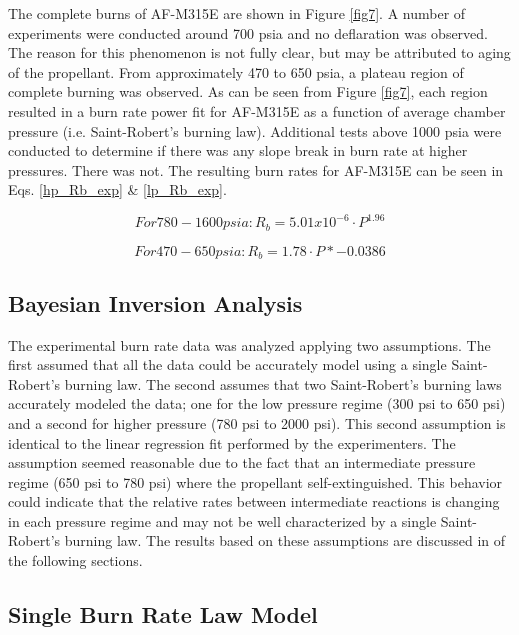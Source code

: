 \documentclass{article}
\begin{document}
The complete burns of AF-M315E are shown in Figure \ref{fig7}. A number of experiments were conducted around 700
psia and no deflaration was observed. The reason for this phenomenon is not fully clear, but may be attributed to
aging of the propellant. From approximately 470 to 650 psia, a plateau region of complete burning was observed. As
can be seen from Figure \ref{fig7}, each region resulted in a burn rate power fit for AF-M315E as a function of 
average chamber pressure (i.e. Saint-Robert's burning law). Additional tests above 1000 psia were conducted to
determine if there was any slope break in burn rate at higher pressures. There was not. The resulting burn rates 
for AF-M315E can be seen in Eqs. \ref{hp_Rb_exp} \& \ref{lp_Rb_exp}. 

\begin{equation} \label{hp_Rb_exp}
For 780 - 1600 psia:	R_b=5.01x10^{-6} \cdot P^1.96
\end{equation}

\begin{equation} \label{lp_Rb_exp}
For 470 - 650 psia:	R_b=1.78 \cdot P*{-0.0386}
\end{equation}


\subsection{Bayesian Inversion Analysis} \label{resultsBayes}

The experimental burn rate data was analyzed applying two assumptions. The first assumed
that all the data could be accurately model using a single Saint-Robert's burning law. The second 
assumes that two Saint-Robert's burning laws accurately modeled the data; one for the low pressure 
regime (300 psi to 650 psi) and a second for higher pressure (780 psi to 2000 psi). This 
second assumption is identical to the linear regression fit performed by the experimenters. The assumption
seemed reasonable due to the fact that an intermediate 
pressure regime (650 psi to 780 psi) where the propellant self-extinguished. This behavior 
could indicate that the relative rates between intermediate reactions is changing in each 
pressure regime and may not be well characterized by a single Saint-Robert's burning law. 
The results based on these assumptions are discussed in of the following sections.

\subsection{Single Burn Rate Law Model} \label{singleRate}
\end{document}
